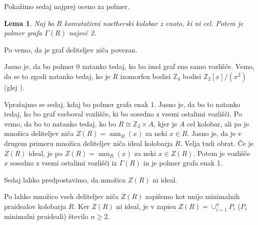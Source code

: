 \documentclass[a4paper, 12pt]{amsart}
\theoremstyle{definition} %
\theoremstyle{plain} %
\newtheorem{lema}[definicija]{Lema}
\newcommand{\Z}{\mathbb Z}
\DeclareMathOperator{\ann}{ann}
\begin{document}
Pokažimo sedaj najprej oceno za polmer.

\begin{lema}
\label{radij}
Naj bo $R$ komutativni noetherski kolobar z enoto, ki ni cel. Potem je polmer grafa $\Gamma(R)$ največ 2.
\end{lema}

\proof
Po \cite[Izrek 3.8]{diploma} vemo, da je graf deliteljev niča povezan.

Jasno je, da bo polmer 0 natanko tedaj, ko bo imel graf eno samo vozlišče. Vemo, da se to zgodi natanko tedaj, ko je $R$ izomorfen bodisi $\Z_4$ bodisi $\Z_2[x]/(x^2)$ (glej \cite[Primer 2.1(a)]{Anderson-klasifikacijaMalihGrafov}).

Vprašajmo se sedaj, kdaj bo polmer grafa enak 1. Jasno je, da bo to natanko tedaj, ko bo graf vseboval vozlišče, ki bo sosedno z vsemi ostalimi vozlišči. Po \cite[Izrek 3.12]{diploma} vemo, da bo to natanko tedaj, ko bo $R\cong \Z_2 \times A$, kjer je $A$ cel kolobar, ali pa je množica deliteljev niča $Z(R) = \ann_R(x)$ za neki $x\in R$. Jasno je, da je v drugem primeru množica deliteljev niča ideal kolobarja $R$. Velja tudi obrat. Če je $Z(R)$ ideal, je po \cite[Izrek 82]{Kaplansky} $Z(R)=\ann_R(x)$ za neki $x\in Z(R)$. Potem je vozlišče $x$ sosedno z vsemi ostalimi vozlišči iz $\Gamma(R)$ in je polmer grafa enak 1.

Sedaj lahko predpostavimo, da množica $Z(R)$ ni ideal. 

Po \cite[Trditev 4.7]{Atiyah} lahko množico vseh deliteljev niča $Z(R)$ zapišemo kot unijo minimalnih praidealov kolobarja $R$. Ker $Z(R)$ ni ideal, je v zapisu $Z(R) = \cup_{i=1}^n P_i$ ($P_i$ minimalni praideali) število $n\ge2$.
\end{document}
